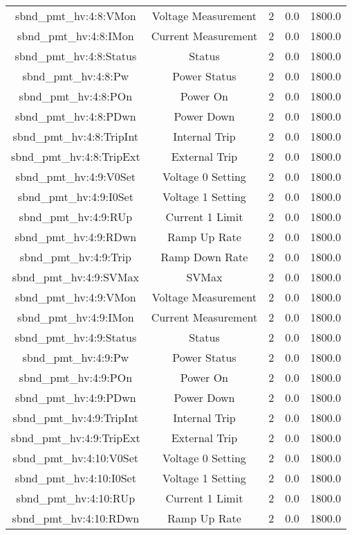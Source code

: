\begin{center}
\begin{longtable}{c | c c c c }
sbnd\_pmt\_hv:4:8:VMon & Voltage Measurement & 2 & 0.0 & 1800.0\\ 
sbnd\_pmt\_hv:4:8:IMon & Current Measurement & 2 & 0.0 & 1800.0\\ 
sbnd\_pmt\_hv:4:8:Status & Status & 2 & 0.0 & 1800.0\\ 
sbnd\_pmt\_hv:4:8:Pw & Power Status & 2 & 0.0 & 1800.0\\ 
sbnd\_pmt\_hv:4:8:POn & Power On & 2 & 0.0 & 1800.0\\ 
sbnd\_pmt\_hv:4:8:PDwn & Power Down & 2 & 0.0 & 1800.0\\ 
sbnd\_pmt\_hv:4:8:TripInt & Internal Trip & 2 & 0.0 & 1800.0\\ 
sbnd\_pmt\_hv:4:8:TripExt & External Trip & 2 & 0.0 & 1800.0\\ 
sbnd\_pmt\_hv:4:9:V0Set & Voltage 0 Setting & 2 & 0.0 & 1800.0\\ 
sbnd\_pmt\_hv:4:9:I0Set & Voltage 1 Setting & 2 & 0.0 & 1800.0\\ 
sbnd\_pmt\_hv:4:9:RUp & Current 1 Limit & 2 & 0.0 & 1800.0\\ 
sbnd\_pmt\_hv:4:9:RDwn & Ramp Up Rate & 2 & 0.0 & 1800.0\\ 
sbnd\_pmt\_hv:4:9:Trip & Ramp Down Rate & 2 & 0.0 & 1800.0\\ 
sbnd\_pmt\_hv:4:9:SVMax & SVMax & 2 & 0.0 & 1800.0\\ 
sbnd\_pmt\_hv:4:9:VMon & Voltage Measurement & 2 & 0.0 & 1800.0\\ 
sbnd\_pmt\_hv:4:9:IMon & Current Measurement & 2 & 0.0 & 1800.0\\ 
sbnd\_pmt\_hv:4:9:Status & Status & 2 & 0.0 & 1800.0\\ 
sbnd\_pmt\_hv:4:9:Pw & Power Status & 2 & 0.0 & 1800.0\\ 
sbnd\_pmt\_hv:4:9:POn & Power On & 2 & 0.0 & 1800.0\\ 
sbnd\_pmt\_hv:4:9:PDwn & Power Down & 2 & 0.0 & 1800.0\\ 
sbnd\_pmt\_hv:4:9:TripInt & Internal Trip & 2 & 0.0 & 1800.0\\ 
sbnd\_pmt\_hv:4:9:TripExt & External Trip & 2 & 0.0 & 1800.0\\ 
sbnd\_pmt\_hv:4:10:V0Set & Voltage 0 Setting & 2 & 0.0 & 1800.0\\ 
sbnd\_pmt\_hv:4:10:I0Set & Voltage 1 Setting & 2 & 0.0 & 1800.0\\ 
sbnd\_pmt\_hv:4:10:RUp & Current 1 Limit & 2 & 0.0 & 1800.0\\ 
sbnd\_pmt\_hv:4:10:RDwn & Ramp Up Rate & 2 & 0.0 & 1800.0\\ 

\end{longtable}
\end{center}
